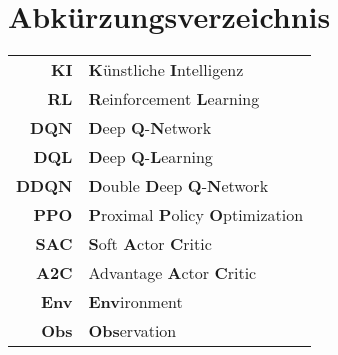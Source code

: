 \chapter{Abkürzungsverzeichnis}
\begin{center}
\begin{tabular}{rl}
\textbf{KI} & \textbf{K}ünstliche \textbf{I}ntelligenz\\
\textbf{RL} & \textbf{R}einforcement \textbf{L}earning \\
\textbf{DQN} & \textbf{D}eep \textbf{Q}-\textbf{N}etwork\\
\textbf{DQL} & \textbf{D}eep \textbf{Q}-\textbf{L}earning\\
\textbf{DDQN} & \textbf{D}ouble \textbf{D}eep \textbf{Q}-\textbf{N}etwork\\
\textbf{PPO} & \textbf{P}roximal \textbf{P}olicy \textbf{O}ptimization\\
\textbf{SAC} & \textbf{S}oft \textbf{A}ctor \textbf{C}ritic\\
\textbf{A2C} & Advantage \textbf{A}ctor \textbf{C}ritic\\
\textbf{Env} & \textbf{Env}ironment \\
\textbf{Obs} & \textbf{Obs}ervation \\
\end{tabular}
\end{center}
 